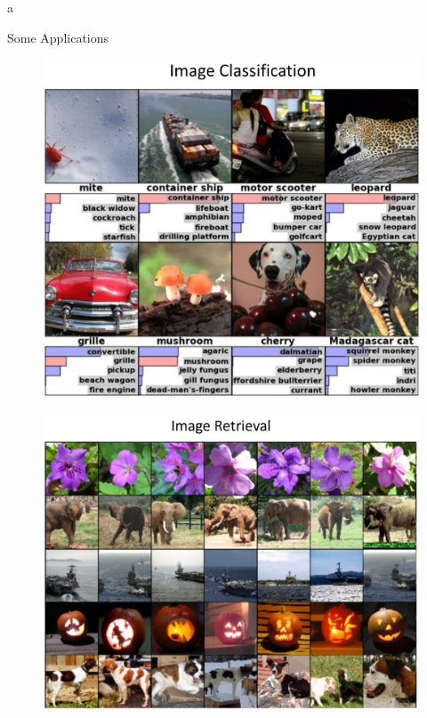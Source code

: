 a\documentclass[10pt]{beamer}
\theoremstyle{remark}
\theoremstyle{definition}
\begin{document}
\begin{frame}[allowframebreaks]{Some Applications}
\begin{figure}
\centering
\includegraphics[width=1.0\textwidth,height=0.9\textheight,keepaspectratio]{./images/cv_2.png}
\end{figure}

\framebreak

\begin{figure}
\centering
\includegraphics[width=1.0\textwidth,height=0.9\textheight,keepaspectratio]{./images/cv_3.png}
\end{figure}


\end{frame}
\end{document}
